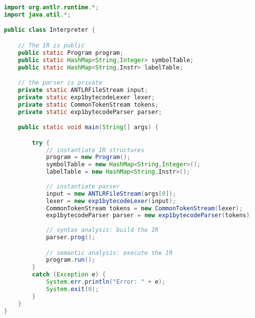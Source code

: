 \begin{minipage}{4.8in}
\begin{lstlisting}[frame=single,language=java]
import org.antlr.runtime.*;
import java.util.*;

public class Interpreter {

    // The IR is public
    public static Program program;
    public static HashMap<String,Integer> symbolTable;
    public static HashMap<String,Instr> labelTable;

    // the parser is private
    private static ANTLRFileStream input;
    private static exp1bytecodeLexer lexer;
    private static CommonTokenStream tokens;
    private static exp1bytecodeParser parser;

    public static void main(String[] args) {

        try {
            // instantiate IR structures
            program = new Program();
            symbolTable = new HashMap<String,Integer>();
            labelTable = new HashMap<String,Instr>();
        
            // instantiate parser
            input = new ANTLRFileStream(args[0]);
            lexer = new exp1bytecodeLexer(input);
            CommonTokenStream tokens = new CommonTokenStream(lexer);
            exp1bytecodeParser parser = new exp1bytecodeParser(tokens);
            
            // syntax analysis: build the IR
            parser.prog();

            // semantic analysis: execute the IR
            program.run();
        }
        catch (Exception e) {
            System.err.println("Error: " + e);
            System.exit(0);
        }
    }
}
\end{lstlisting}
\end{minipage}
